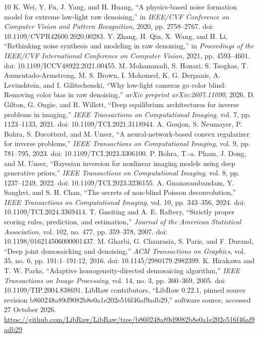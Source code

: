 \documentclass[10pt,twocolumn,journal]{IEEEtran}
\begin{document}
\begin{thebibliography}{10}
 K. Wei, Y. Fu, J. Yang, and H. Huang, ``A physics-based noise formation model for extreme low-light raw denoising,'' in \emph{IEEE/CVF Conference on Computer Vision and Pattern Recognition}, 2020, pp. 2758--2767. doi: 10.1109/CVPR42600.2020.00283.
 Y. Zhang, H. Qin, X. Wang, and H. Li, ``Rethinking noise synthesis and modeling in raw denoising,'' in \emph{Proceedings of the IEEE/CVF International Conference on Computer Vision}, 2021, pp. 4593--4601. doi: 10.1109/ICCV48922.2021.00455.
 M. Mohammadi, S. Honari, S. Tsogkas, T. Aumentado-Armstrong, M. S. Brown, I. Mohomed, K. G. Derpanis, A. Levinshtein, and I. Gilitschenski, ``Why low-light cameras go color blind: Removing color bias in raw denoising,'' \emph{arXiv preprint arXiv:2607.11090}, 2026.
 D. Gilton, G. Ongie, and R. Willett, ``Deep equilibrium architectures for inverse problems in imaging,'' \emph{IEEE Transactions on Computational Imaging}, vol. 7, pp. 1123--1133, 2021. doi: 10.1109/TCI.2021.3118944.
 A. Goujon, S. Neumayer, P. Bohra, S. Ducotterd, and M. Unser, ``A neural-network-based convex regularizer for inverse problems,'' \emph{IEEE Transactions on Computational Imaging}, vol. 9, pp. 781--795, 2023. doi: 10.1109/TCI.2023.3306100.
 P. Bohra, T.-a. Pham, J. Dong, and M. Unser, ``Bayesian inversion for nonlinear imaging models using deep generative priors,'' \emph{IEEE Transactions on Computational Imaging}, vol. 8, pp. 1237--1249, 2022. doi: 10.1109/TCI.2023.3236155.
 A. Gnanasambandam, Y. Sanghvi, and S. H. Chan, ``The secrets of non-blind Poisson deconvolution,'' \emph{IEEE Transactions on Computational Imaging}, vol. 10, pp. 343--356, 2024. doi: 10.1109/TCI.2024.3369414.
 T. Gneiting and A. E. Raftery, ``Strictly proper scoring rules, prediction, and estimation,'' \emph{Journal of the American Statistical Association}, vol. 102, no. 477, pp. 359--378, 2007. doi: 10.1198/016214506000001437.
 M. Gharbi, G. Chaurasia, S. Paris, and F. Durand, ``Deep joint demosaicking and denoising,'' \emph{ACM Transactions on Graphics}, vol. 35, no. 6, pp. 191:1--191:12, 2016. doi: 10.1145/2980179.2982399.
 K. Hirakawa and T. W. Parks, ``Adaptive homogeneity-directed demosaicing algorithm,'' \emph{IEEE Transactions on Image Processing}, vol. 14, no. 3, pp. 360--369, 2005. doi: 10.1109/TIP.2004.838691.
 LibRaw contributors, ``LibRaw 0.22.1, pinned source revision b860248a89d9082b8e0a1e202e516f46af9adb29,'' software source, accessed 27 October 2026. \url{https://github.com/LibRaw/LibRaw/tree/b860248a89d9082b8e0a1e202e516f46af9adb29}

\end{thebibliography}
\end{document}
